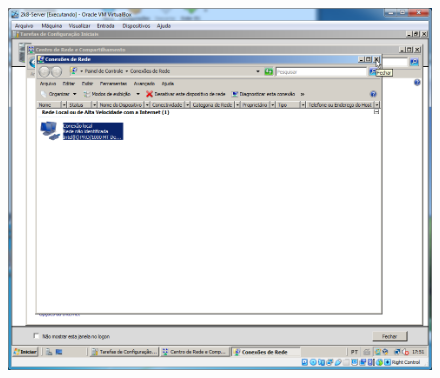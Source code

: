 \documentclass[10pt]{article}
\begin{document}
\begin{figure}[H]
    \centering
    \caption{}
    \label{fig:4246}
    \includegraphics[width=\linewidth]{images/configuracao_windows/windows_server/036.png}
\end{figure}
\end{document}
